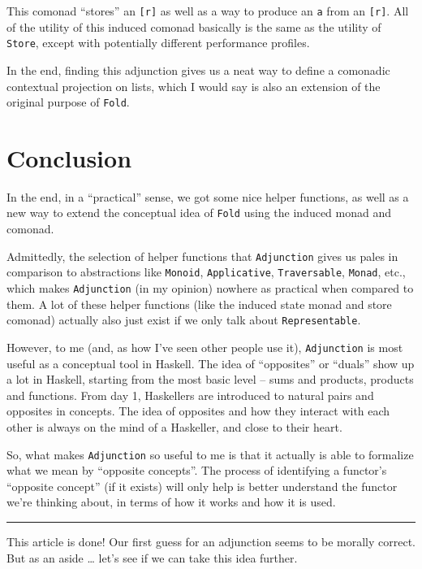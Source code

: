\documentclass[]{article}
\begin{document}
This comonad ``stores'' an \texttt{{[}r{]}} as well as a way to produce an
\texttt{a} from an \texttt{{[}r{]}}. All of the utility of this induced comonad
basically is the same as the utility of \texttt{Store}, except with potentially
different performance profiles.

In the end, finding this adjunction gives us a neat way to define a comonadic
contextual projection on lists, which I would say is also an extension of the
original purpose of \texttt{Fold}.

\hypertarget{conclusion}{%
\section{Conclusion}\label{conclusion}}

In the end, in a ``practical'' sense, we got some nice helper functions, as well
as a new way to extend the conceptual idea of \texttt{Fold} using the induced
monad and comonad.

Admittedly, the selection of helper functions that \texttt{Adjunction} gives us
pales in comparison to abstractions like \texttt{Monoid}, \texttt{Applicative},
\texttt{Traversable}, \texttt{Monad}, etc., which makes \texttt{Adjunction} (in
my opinion) nowhere as practical when compared to them. A lot of these helper
functions (like the induced state monad and store comonad) actually also just
exist if we only talk about \texttt{Representable}.

However, to me (and, as how I've seen other people use it), \texttt{Adjunction}
is most useful as a conceptual tool in Haskell. The idea of ``opposites'' or
``duals'' show up a lot in Haskell, starting from the most basic level -- sums
and products, products and functions. From day 1, Haskellers are introduced to
natural pairs and opposites in concepts. The idea of opposites and how they
interact with each other is always on the mind of a Haskeller, and close to
their heart.

So, what makes \texttt{Adjunction} so useful to me is that it actually is able
to formalize what we mean by ``opposite concepts''. The process of identifying a
functor's ``opposite concept'' (if it exists) will only help is better
understand the functor we're thinking about, in terms of how it works and how it
is used.

\begin{center}\rule{0.5\linewidth}{\linethickness}\end{center}

This article is done! Our first guess for an adjunction seems to be morally
correct. But as an aside \ldots{} let's see if we can take this idea further.
\end{document}

